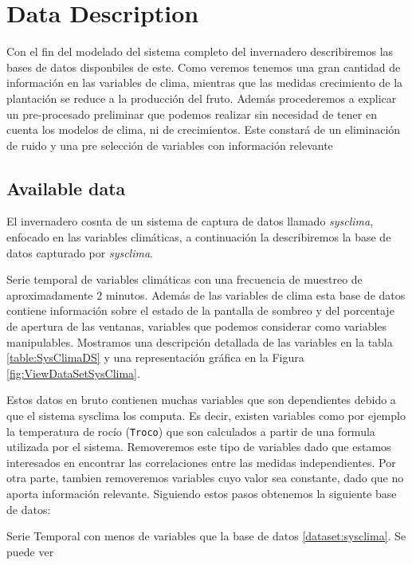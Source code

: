 \chapter{Data Description}


Con el fin del modelado del sistema completo del invernadero describiremos las bases de datos disponbiles de este. Como veremos tenemos una gran cantidad de información en las variables de clima, mientras que las medidas  crecimiento de la plantación se reduce a la producción del fruto. Además procederemos a explicar un pre-procesado preliminar que podemos realizar sin necesidad de tener en cuenta los modelos de clima, ni de crecimientos. Este constará de un eliminación de ruido y una pre selección de variables con información relevante

\section{Available data}


El invernadero cosnta de un sistema de captura de datos llamado \emph{sysclima}, enfocado en las variables climáticas, a continuación la describiremos la base de datos capturado por \emph{sysclima}. 

\begin{dataset}[SysClima]\label{dataset:sysclima}
Serie temporal de variables climáticas con una frecuencia de muestreo de aproximadamente $2$ minutos. Además de las variables de clima esta base de datos contiene información sobre el estado de la pantalla de sombreo y del porcentaje de apertura de las ventanas, variables que podemos considerar como variables manipulables. Mostramos una descripción detallada de las variables en la tabla \ref{table:SysClimaDS} y una representación gráfica en la Figura \ref{fig:ViewDataSetSysClima}.
\end{dataset}

Estos datos en bruto contienen muchas variables que son dependientes debido a que el sistema sysclima los computa. Es decir, existen variables como por ejemplo la temperatura de rocío (\texttt{Troco}) que son calculados a partir de una formula utilizada por el sistema. Removeremos este tipo de variables dado que estamos interesados en encontrar las correlaciones entre las medidas independientes. Por otra parte, tambien removeremos variables cuyo valor sea constante, dado que no aporta información relevante. Siguiendo estos pasos obtenemos la siguiente base de datos:

\begin{dataset}\label{dataset:sysclima2}
    Serie Temporal con menos de variables que la base de datos \ref{dataset:sysclima}. Se puede ver 
\end{dataset}

